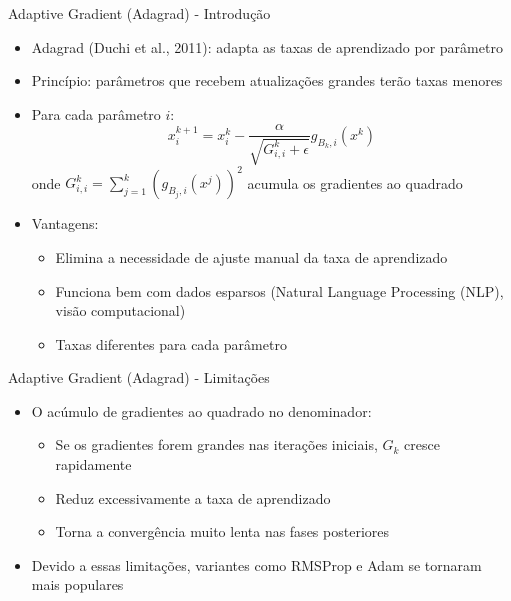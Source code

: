 \documentclass[aspectratio=1610]{beamer}
\begin{document}
\begin{frame}{Adaptive Gradient (Adagrad) - Introdução}
\begin{itemize}
    \item Adagrad (Duchi et al., 2011): adapta as taxas de aprendizado por parâmetro \pause
    \item Princípio: parâmetros que recebem atualizações grandes terão taxas menores \pause
    \item Para cada parâmetro $i$: \pause
    \begin{equation*}
        x_i^{k+1} = x_i^k - \frac{\alpha}{\sqrt{G_{i,i}^k + \epsilon}} g_{B_k,i}(x^k)
    \end{equation*}
    onde $G_{i,i}^k = \sum_{j=1}^{k} (g_{B_j,i}(x^j))^2$ acumula os gradientes ao quadrado \pause
    \item Vantagens: \pause
    \begin{itemize}
        \item Elimina a necessidade de ajuste manual da taxa de aprendizado \pause
        \item Funciona bem com dados esparsos (Natural Language Processing (NLP), visão computacional) \pause
        \item Taxas diferentes para cada parâmetro
    \end{itemize}
\end{itemize}
\end{frame}

\begin{frame}{Adaptive Gradient (Adagrad) - Limitações}
    \begin{itemize}
        \item O acúmulo de gradientes ao quadrado no denominador:
        \pause
        \begin{itemize}
            \item Se os gradientes forem grandes nas iterações iniciais, $G_{k}$ cresce rapidamente
            \pause
            \item Reduz excessivamente a taxa de aprendizado
            \pause
            \item Torna a convergência muito lenta nas fases posteriores
        \end{itemize}
        \pause
        \item Devido a essas limitações, variantes como RMSProp e Adam se tornaram mais populares
    \end{itemize}
\end{frame}
\end{document}
